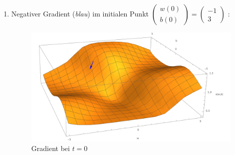 \documentclass{article}
\begin{document}
\begin{enumerate}
\begin{enumerate}[label=\alph*)]
          \item Negativer Gradient (\textit{blau}) im initialen Punkt $\begin{pmatrix}w(0) \\ b(0)\end{pmatrix} = \begin{pmatrix} -1 \\ 3 \end{pmatrix}$ :
                \begin{figure}[H]
                  \centering
                  \includegraphics[width=\textwidth]{initial-error-gradient.pdf}
                  \caption{Gradient bei $t=0$}
                \end{figure}


\end{enumerate}
\end{enumerate}
\end{document}
